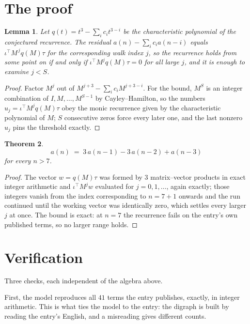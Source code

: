 \documentclass[11pt,a4paper]{article}
\theoremstyle{plain}
\newtheorem{theorem}{Theorem}
\newtheorem{lemma}[theorem]{Lemma}
\theoremstyle{definition}
\begin{document}
\section{The proof}

\begin{lemma}\label{lem:crit}
Let $q(t)=t^{3}-\sum_i c_it^{3-i}$ be the characteristic polynomial of the
conjectured recurrence. The residual $a(n)-\sum_ic_ia(n-i)$ equals
$\iota^{\!\top}M^{\,j}q(M)\tau$ for the corresponding walk index $j$, so the recurrence
holds from some point on if and only if $\iota^{\!\top}M^{j}q(M)\tau=0$ for all large $j$,
and it is enough to examine $j<S$.
\end{lemma}

\begin{proof}
Factor $M^{j}$ out of $M^{j+3}-\sum_ic_iM^{j+3-i}$. For the bound, $M^{S}$
is an integer combination of $I,M,\dots,M^{S-1}$ by Cayley--Hamilton, so the numbers
$u_j=\iota^{\!\top}M^{j}q(M)\tau$ obey the monic recurrence given by the characteristic
polynomial of $M$; $S$ consecutive zeros force every later one, and the last nonzero $u_j$
pins the threshold exactly.
\end{proof}

\begin{theorem}
\[
a(n)\;=\;3\,a(n-1) - 3\,a(n-2) + a(n-3)
\]
for every $n>7$.
\end{theorem}

\begin{proof}
The vector $w=q(M)\tau$ was formed by $3$ matrix--vector products in exact integer
arithmetic and $\iota^{\!\top}M^{j}w$ evaluated for $j=0,1,\dots$, again exactly; those
integers vanish from the index corresponding to $n=7+1$ onwards and the run continued
until the working vector was identically zero, which settles every larger $j$ at once. The bound is exact: at $n=7$ the recurrence fails on the entry's own published terms, so no larger range holds.
\end{proof}

\section{Verification}

Three checks, each independent of the algebra above.

First, the model reproduces all $41$ terms the entry publishes, exactly, in integer
arithmetic. This is what ties the model to the entry: the digraph is built by reading the
entry's English, and a misreading gives different counts.
\end{document}
